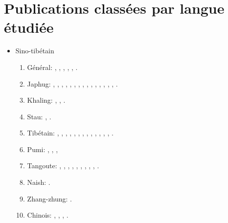 \documentclass[oldfontcommands,oneside,a4paper,11pt]{article}
\newcommand{\langue}[2]{#2}
\begin{document}
\section{\langue{By languages}{Publications classées par langue étudiée}}
\begin{itemize}
\item \langue{Sino-Tibetan}{Sino-tibétain}
\begin{enumerate}
\item \langue{General}{Général}: \citet{jacques03s.houzhui}, \citet{jacques06morpho}, \citet{jacques07chang}, \citet{antonov12kumush}, \citet{jacques12agreement},    \citet{michaud-jacques12nasalite}.     
\item Japhug:  \citet{jacques04redupl},     \citet{jacques04these},   \citet{jacques07passif},  \citet{jacques07redupl}, \citet{jacques08},  \citet{jacques10gesar}, \citet{jacques10refl},  \citet{jacques10inverse},  \citet{jacques12incorp},   \citet{jacques12demotion},  \citet{jacques13harmonization},  \citet{jacques13tropative}, \citet{jacques14antipassive}, \citet{japhug14ideophones}, \citet{jacques14inverse}, \citet{jacques14linking}.
\item Khaling: \citet{jacques12khaling},  \citet{jacques13derivational.khaling}, \citet{jacques14auditory}.
\item Stau: \citet{antonov14rtau}, \citet{jacques14rtau}.
\item \langue{Tibetan}{Tibétain}:  \citet{jacques01dg}, \citet{jacques04thimphu}, \citet{jacques07naksatram},      \citet{jacques08debther},  \citet{jacques09wazur}, \citet{jacques09e},  \citet{jacques10zos},   \citet{jacques10ndr},  \citet{jacques11lingua},  \citet{jacques12internal},  \citet{jacques12transcription}, \citet{jacques13yod}, \citet{jacques14snom}, \citet{jacques14cone}.
\item Pumi:  \citet{michaud10bonin}, \citet{jacques11pumi.tone}, \citet{jacques11lingua}, 
\item \langue{Tangut}{Tangoute}: \citet{jacques06comparaison},  \citet{jacques07textes}, \citet{jacques08weiyu}, \citet{jacques08alternations},   \citet{jacques09tangutverb},  \citet{jacques10imperial},  \citet{jacques11tangut.verb}, \citet{jacques11ngwemi}, \citet{jacques11kinship},  \citet{jacques14esquisse}.
\item Naish: \citet{jacques.michaud11naish}.
\item  Zhang-zhung: \citet{jacques09zz}.
\item \langue{Chinese}{Chinois}:  \citet{jacques00ywij},  \citet{jacques03dissimilation},   \citet{jacques2015genetic}, \citet{jacques2015traditional}.

\end{enumerate}
\end{itemize}
\end{document}
